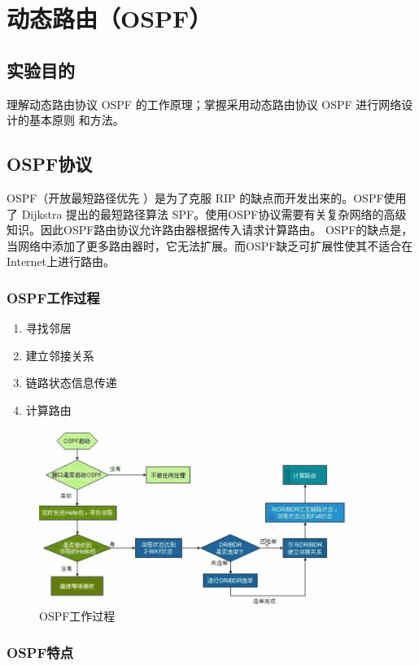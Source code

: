 \documentclass[a4paper,12pt]{report}
\begin{document}
\chapter{动态路由（OSPF）
}
\setcounter{page}{1}
\begin{spacing}{1.5}
\songti{}

\section{实验目的}
理解动态路由协议 OSPF 的工作原理；掌握采用动态路由协议 OSPF 进行网络设计的基本原则 和方法。

\section{OSPF协议}
OSPF（开放最短路径优先 ）是为了克服 RIP 的缺点而开发出来的。OSPF使用了 Dijkstra 提出的最短路径算法 SPF。使用OSPF协议需要有关复杂网络的高级知识。因此OSPF路由协议允许路由器根据传入请求计算路由。
OSPF的缺点是，当网络中添加了更多路由器时，它无法扩展。而OSPF缺乏可扩展性使其不适合在Internet上进行路由。

\subsection{OSPF工作过程}

\begin{enumerate}
\item 寻找邻居
\item 建立邻接关系
\item 链路状态信息传递
\item 计算路由
\end{enumerate}

\begin{figure}[htb!]
  \centering
\includegraphics[width=10cm]{figure/ospfwaht.jpg}
\caption{OSPF工作过程}
\label{26}
\end{figure}

\subsection{OSPF特点}


\end{spacing}
\end{document}

